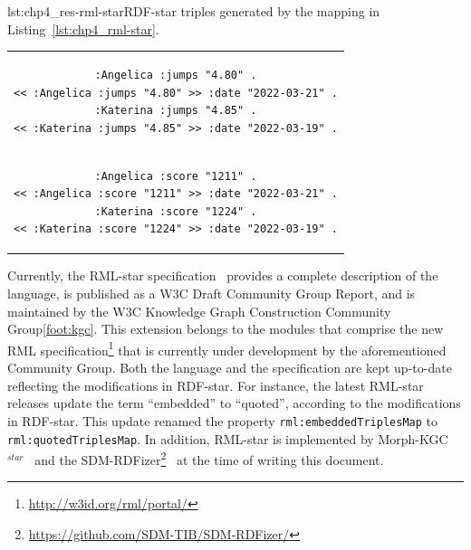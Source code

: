 \noindent\hspace{0.1\linewidth}\begin{minipage}{\linewidth}
\begin{captionedlisting}{lst:chp4_res-rml-star}{RDF-star triples generated by the mapping in Listing~\ref{lst:chp4_rml-star}.}
\centering
\begin{tabular}{c}
\hspace{2em}
{\begin{lstlisting}[basicstyle=\ttfamily\small,label={list:example1},columns=flexible]
:Angelica :jumps "4.80" .
<< :Angelica :jumps "4.80" >> :date "2022-03-21" .
:Katerina :jumps "4.85" .
<< :Katerina :jumps "4.85" >> :date "2022-03-19" .
\end{lstlisting}}\\
\hspace{2em}
{\begin{lstlisting}[basicstyle=\ttfamily\small,label={list:example1},columns=flexible,frame=l,rulecolor=\color{red},framerule=0.75pt,firstnumber=5]
:Angelica :score "1211" .
<< :Angelica :score "1211" >> :date "2022-03-21" .
:Katerina :score "1224" .
<< :Katerina :score "1224" >> :date "2022-03-19" .
\end{lstlisting}}

\end{tabular}
\end{captionedlisting}
\end{minipage}


Currently, the \mbox{RML-star} specification~\parencite{iglesias2022rmlstar} provides a complete description of the language, is published as a W3C Draft Community Group Report, and is maintained by the W3C Knowledge Graph Construction Community Group\cref{foot:kgc}. 
This extension belongs to the modules that comprise the new RML specification\footnote{\label{foot:rml-portal}\url{http://w3id.org/rml/portal/}} that is currently under development by the aforementioned Community Group. 
Both the language and the specification are kept up-to-date reflecting the modifications in \mbox{RDF-star}.
For instance, the latest \mbox{RML-star} releases update the term ``embedded'' to ``quoted'',
according to the modifications in \mbox{RDF-star}.
This update renamed the property \texttt{rml:embeddedTriplesMap} to \texttt{rml:quotedTriplesMap}.
In addition, RML-star is implemented by Morph-KGC$^{star}$~\parencite{arenas2023morphstar} and the SDM-RDFizer\footnote{\url{https://github.com/SDM-TIB/SDM-RDFizer/}}~\parencite{eiglesias34_2024_11191586} at the time of writing this document.




